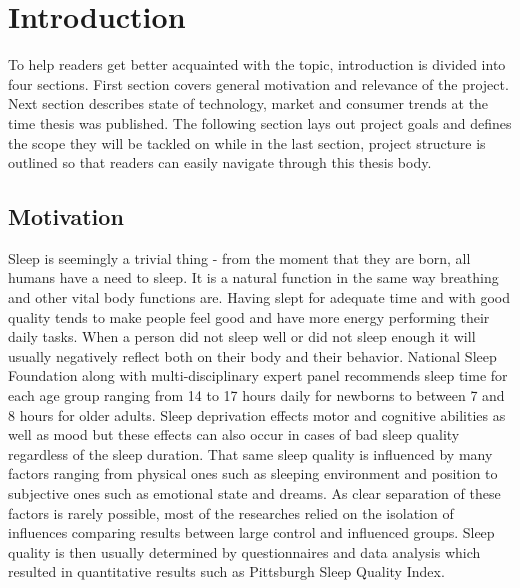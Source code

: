 \chapter{Introduction}
To help readers get better acquainted with the topic, introduction is divided into four sections. First section covers general motivation and relevance of the project. Next section describes state of technology, market and consumer trends at the time thesis was published. The following section lays out project goals and defines the scope they will be tackled on while in the last section, project structure is outlined so that readers can easily navigate through this thesis body.

\section{Motivation}
Sleep is seemingly a trivial thing - from the moment that they are born, all humans have a need to sleep. It is a natural function in the same way breathing and other vital body functions are. Having slept for adequate time and with good quality tends to make people feel good and have more energy performing their daily tasks. When a person did not sleep well or did not sleep enough it will usually negatively reflect both on their body and their behavior. National Sleep Foundation along with multi-disciplinary expert panel recommends sleep time for each age group ranging from 14 to 17 hours daily for newborns to between 7 and 8 hours for older adults\cite{NSF}. Sleep deprivation effects motor and cognitive abilities as well as mood but these effects can also occur in cases of bad sleep quality regardless of the sleep duration\cite{doi:10.1093/sleep/19.4.318}. That same sleep quality is influenced by many factors ranging from physical ones such as sleeping environment and position to subjective ones such as emotional state and dreams. As clear separation of these factors is rarely possible, most of the researches relied on the isolation of influences comparing results between large control and influenced groups. Sleep quality is then usually determined by questionnaires and data analysis which resulted in quantitative results such as Pittsburgh Sleep Quality Index\cite{psqi}.\\

